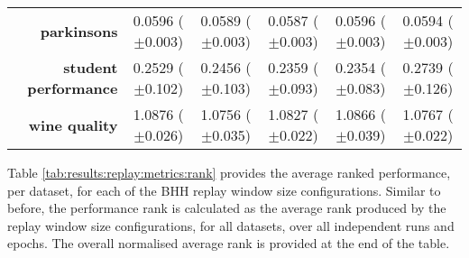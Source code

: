 \begin{table}[htb]
{\begin{tabular}{r|ccccc}
                  \textbf{parkinsons}          & \cellcolor[rgb]{ .973,  .412,  .42}0.0596 ($\pm$0.003)  & \cellcolor[rgb]{ .576,  .8,  .49}0.0589 ($\pm$0.003)    & \cellcolor[rgb]{ .388,  .745,  .482}0.0587 ($\pm$0.003) & \cellcolor[rgb]{ .976,  .424,  .424}0.0596 ($\pm$0.003) & \cellcolor[rgb]{ 1,  .922,  .518}0.0594 ($\pm$0.003)    \\
                  \textbf{student performance} & \cellcolor[rgb]{ .996,  .792,  .494}0.2529 ($\pm$0.102) & \cellcolor[rgb]{ 1,  .922,  .518}0.2456 ($\pm$0.103)    & \cellcolor[rgb]{ .42,  .753,  .482}0.2359 ($\pm$0.093)  & \cellcolor[rgb]{ .388,  .745,  .482}0.2354 ($\pm$0.083) & \cellcolor[rgb]{ .973,  .412,  .42}0.2739 ($\pm$0.126)  \\
                  \textbf{wine quality}        & \cellcolor[rgb]{ .973,  .412,  .42}1.0876 ($\pm$0.026)  & \cellcolor[rgb]{ .388,  .745,  .482}1.0756 ($\pm$0.035) & \cellcolor[rgb]{ 1,  .922,  .518}1.0827 ($\pm$0.022)    & \cellcolor[rgb]{ .98,  .522,  .443}1.0866 ($\pm$0.039)  & \cellcolor[rgb]{ .482,  .773,  .486}1.0767 ($\pm$0.022) \\
            \end{tabular}%
      }
\end{table}%

Table \ref{tab:results:replay:metrics:rank} provides the average ranked performance, per dataset, for each of the \acs{BHH} replay window size configurations. Similar to before, the performance rank is calculated as the average rank produced by the replay window size configurations, for all datasets, over all independent runs and epochs. The overall normalised average rank is provided at the end of the table.

